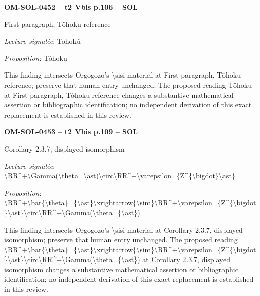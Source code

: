 \par\noindent\textbf{OM-SOL-0452 -- t2 Vbis p.106 -- SOL}\par
First paragraph, Tôhoku reference\par
\emph{Lecture signalée}: Tohokû\par
\emph{Proposition}: Tôhoku\par
This finding intersects Orgogozo's \textbackslash{}sisi material at First paragraph, Tôhoku reference; preserve that human entry unchanged. The proposed reading Tôhoku at First paragraph, Tôhoku reference changes a substantive mathematical assertion or bibliographic identification; no independent derivation of this exact replacement is established in this review.\par
\par\noindent\textbf{OM-SOL-0453 -- t2 Vbis p.109 -- SOL}\par
Corollary 2.3.7, displayed isomorphism\par
\emph{Lecture signalée}: \textbackslash{}RR\textasciicircum{}+\textbackslash{}Gamma(\textbackslash{}theta\_\textbackslash{}ast)\textbackslash{}circ\textbackslash{}RR\textasciicircum{}+\textbackslash{}varepsilon\_\{Z\textasciicircum{}\{\textbackslash{}bigdot\}\textbackslash{}ast\}\par
\emph{Proposition}: \textbackslash{}RR\textasciicircum{}+\textbackslash{}bar\{\textbackslash{}theta\}\_\{\textbackslash{}ast\}\textbackslash{}xrightarrow\{\textbackslash{}sim\}\textbackslash{}RR\textasciicircum{}+\textbackslash{}varepsilon\_\{Z\textasciicircum{}\{\textbackslash{}bigdot\}\textbackslash{}ast\}\textbackslash{}circ\textbackslash{}RR\textasciicircum{}+\textbackslash{}Gamma(\textbackslash{}theta\_\{\textbackslash{}ast\})\par
This finding intersects Orgogozo's \textbackslash{}sisi material at Corollary 2.3.7, displayed isomorphism; preserve that human entry unchanged. The proposed reading \textbackslash{}RR\textasciicircum{}+\textbackslash{}bar\{\textbackslash{}theta\}\_\{\textbackslash{}ast\}\textbackslash{}xrightarrow\{\textbackslash{}sim\}\textbackslash{}RR\textasciicircum{}+\textbackslash{}varepsilon\_\{Z\textasciicircum{}\{\textbackslash{}bigdot\}\textbackslash{}ast\}\textbackslash{}circ\textbackslash{}RR\textasciicircum{}+\textbackslash{}Gamma(\textbackslash{}theta\_\{\textbackslash{}ast\}) at Corollary 2.3.7, displayed isomorphism changes a substantive mathematical assertion or bibliographic identification; no independent derivation of this exact replacement is established in this review.\par
